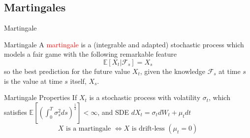 \documentclass{beamer}
\begin{document}
\subsection{Martingales}
\begin{frame}{Martingale}
\begin{block}{Martingale}
A \textcolor{red}{martingale} is a (integrable and adapted) stochastic process which models a fair game with the following remarkable feature
\begin{equation}
\mathbb{E}[X_t|\mathcal{F}_s] = X_s
\end{equation}
so the best prediction for the future value $X_t$, given the knowledge $\mathcal{F}_s$ at time $s$ is the value at time $s$ itself, $X_s$.
\end{block}
\begin{block}{Martingale Properties}
If $X_t$ is a stochastic process with volatility $\sigma_t$, which satisfies $\mathbb{E}[(\int_0^T\sigma^2_s ds)^{\frac{1}{2}}]<\infty$, and SDE $dX_t=\sigma_t dW_t+\mu_t dt$ 
\begin{equation*}
X\text{ is a martingale } \iff X\text{ is drift-less } (\mu_t=0)
\end{equation*}
\end{block}	
\end{frame}
\end{document}
